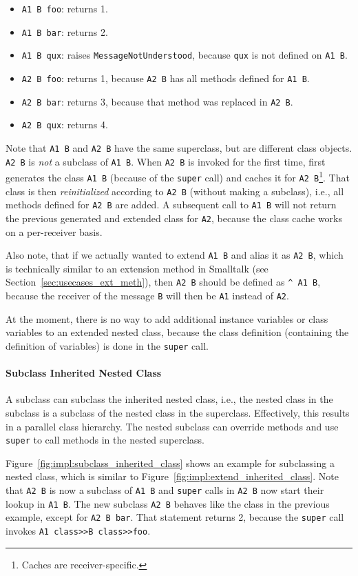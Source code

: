 \begin{itemize}
	\item \texttt{A1 B foo}: returns 1.
	\item \texttt{A1 B bar}: returns 2.
	\item \texttt{A1 B qux}: raises \texttt{MessageNotUnderstood}, because \texttt{qux} is not defined on \texttt{A1 B}.
	\item \texttt{A2 B foo}: returns 1, because \texttt{A2 B} has all methods defined for \texttt{A1 B}.
	\item \texttt{A2 B bar}: returns 3, because that method was replaced in \texttt{A2 B}.
	\item \texttt{A2 B qux}: returns 4.
\end{itemize}

Note that \texttt{A1 B} and \texttt{A2 B} have the same superclass, but are different class objects. \texttt{A2 B} is \emph{not} a subclass of \texttt{A1 B}. When \texttt{A2 B} is invoked for the first time, \msname first generates the class \texttt{A1 B} (because of the \texttt{super} call) and caches it for \texttt{A2 B}\footnote{Caches are receiver-specific.}. That class is then \emph{reinitialized} according to \texttt{A2 B} (without making a subclass), i.e., all methods defined for \texttt{A2 B} are added. A subsequent call to \texttt{A1 B} will not return the previous generated and extended class for \texttt{A2}, because the class cache works on a per-receiver basis.

Also note, that if we actually wanted to extend \texttt{A1 B} and alias it as \texttt{A2 B}, which is technically similar to an extension method in Smalltalk (see Section~\ref{sec:usecases_ext_meth}), then \texttt{A2 B} should be defined as \texttt{\^{} A1 B}, because the receiver of the message \texttt{B} will then be \texttt{A1} instead of \texttt{A2}. 

At the moment, there is no way to add additional instance variables or class variables to an extended nested class, because the class definition (containing the definition of variables) is done in the \texttt{super} call. 

\paragraph{Subclass Inherited Nested Class}
A subclass can subclass the inherited nested class, i.e., the nested class in the subclass is a subclass of the nested class in the superclass. Effectively, this results in a parallel class hierarchy. The nested subclass can override methods and use \texttt{super} to call methods in the nested superclass.

Figure~\ref{fig:impl:subclass_inherited_class} shows an example for subclassing a nested class, which is similar to Figure~\ref{fig:impl:extend_inherited_class}. Note that \texttt{A2 B} is now a subclass of \texttt{A1 B} and \texttt{super} calls in \texttt{A2 B} now start their lookup in \texttt{A1 B}. The new subclass \texttt{A2 B} behaves like the class in the previous example, except for \texttt{A2 B bar}. That statement returns 2, because the \texttt{super} call invokes \texttt{A1 class>>B class>>foo}.

